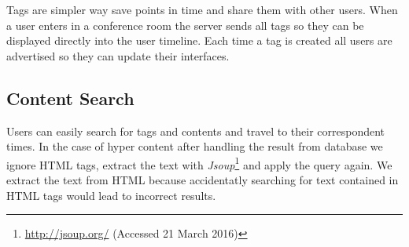 	Tags are simpler way save points in time and share them with other users. When a user enters in a conference room the server sends all tags so they can be displayed directly into the user timeline. Each time a tag is created all users are advertised so they can update their interfaces.

	\subsection{Content Search}

	Users can easily search for tags and contents and travel to their correspondent times. In the case of hyper content after handling the result from database we ignore \ac{HTML} tags, extract the text with \emph{Jsoup}\footnote{\url{http://jsoup.org/} (Accessed 21 March 2016)} and apply the query again. We extract the text from \ac{HTML} because accidentatly searching for text contained in \ac{HTML} tags would lead to incorrect results.